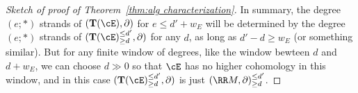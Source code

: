 \documentclass[12pt]{amsart}
\theoremstyle{definition}
\theoremstyle{remark}
\newcommand{\Tate}{{\mathbf{T}}}
\newcommand{\ZZ}{\mathbb Z}
\newcommand{\Pic}{\operatorname{Pic}}
\newcommand{\daniel}[1]{{\color{blue} \sf $\clubsuit\clubsuit\clubsuit$ Daniel: [#1]}}
\begin{document}
\begin{proof}[Sketch of proof of Theorem~\ref{thm:alg characterization}]
In summary, the degree $(e;*)$ strands of $(\Tate(\cE),\partial)$ for $e\leq d'+w_E$ will be determined by the degree $(e;*)$ strands of $(\Tate(\cE)_{\geq d}^{\leq d'},\partial)$ for any $d$, as long as $d'-d\geq w_E$ (or something similar).  But for any finite window of degrees, like the window bewteen $d$ and $d+w_E$, we can choose $d\gg 0$ so that $\cE$ has no higher cohomology in this window, and in this case $(\Tate(\cE)_{\geq d}^{\leq d'},\partial)$ is just $(\RR M,\partial)_{\geq d}^{\leq d'}$.
%

%
%
%
%
%
%
%
%


\end{proof}
\end{document}
